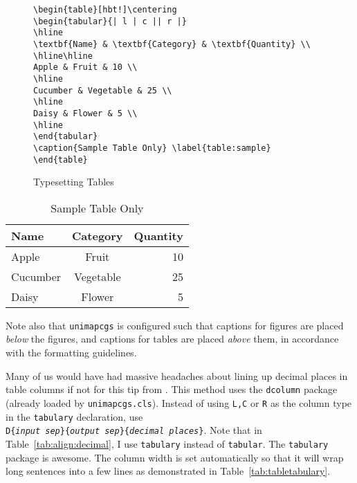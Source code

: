 \begin{figure}[hbt!]
\begin{lstlisting}
\begin{table}[hbt!]\centering
\begin{tabular}{| l | c || r |}
\hline
\textbf{Name} & \textbf{Category} & \textbf{Quantity} \\ 
\hline\hline
Apple & Fruit & 10 \\ 
\hline
Cucumber & Vegetable & 25 \\ 
\hline
Daisy & Flower & 5 \\ 
\hline
\end{tabular}
\caption{Sample Table Only} \label{table:sample}
\end{table}
\end{lstlisting}
\caption{Typesetting Tables}\label{fig:lst:table}
\end{figure}

\begin{table}[hbt!]\centering
\begin{tabular}{| l | c || r |}
\hline
\textbf{Name} & \textbf{Category} & \textbf{Quantity} \\ 
\hline\hline
Apple & Fruit & 10 \\ 
\hline
Cucumber & Vegetable & 25 \\ 
\hline
Daisy & Flower & 5 \\ 
\hline
\end{tabular}
\caption{Sample Table Only} \label{table:sample}
\end{table}

Note also that \verb|unimapcgs| is configured such that captions for figures are placed \emph{below} the figures, and captions for tables are placed \emph{above} them, in accordance with the formatting guidelines.

Many of us would have had massive headaches about lining up decimal places in table columns if not for this tip from \citep[pp.~274--276]{latex:companion}. This method uses the \verb|dcolumn| package (already loaded by \verb|unimapcgs.cls|). Instead of using \verb|L,C| or \verb|R| as the column type in the \verb|tabulary| declaration, use\\ \texttt{D\{\textit{input sep}\}\{\textit{output sep}\}\{\textit{decimal places}\}}. Note that in Table~\ref{tab:align:decimal}, I use \verb|tabulary| instead of \verb|tabular|. The \verb|tabulary| package is awesome. The column width is set automatically so that it will wrap long sentences into a few lines as demonstrated in Table~\ref{tab:tabletabulary}. 

